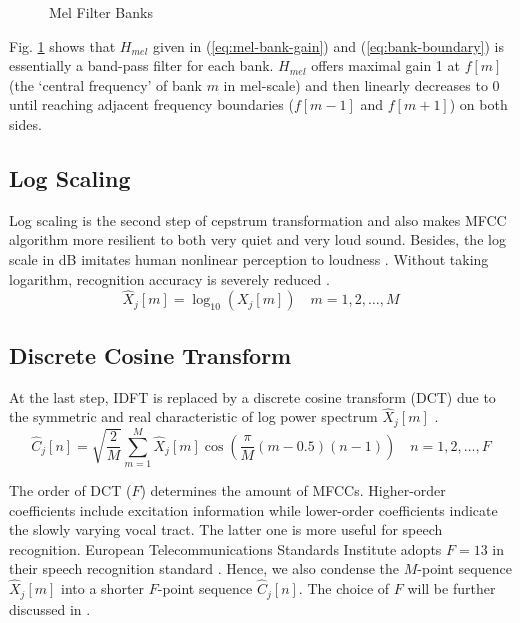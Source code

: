 \begin{figure}[H]
\centering
{}
\caption{Mel Filter Banks}
\label{mel_triangle}
\end{figure}

Fig. \ref{mel_triangle} shows that $H_{mel}$ given in (\ref{eq:mel-bank-gain}) and (\ref{eq:bank-boundary}) is essentially a band-pass filter for each bank. $H_{mel}$ offers maximal gain 1 at $f[m]$ (the `central frequency' of bank $m$ in mel-scale) and then linearly decreases to 0 until reaching adjacent frequency boundaries ($f[m-1]$ and $f[m+1]$) on both sides.


\subsection{Log Scaling}

Log scaling is the second step of cepstrum transformation and also makes MFCC algorithm more resilient to both very quiet and very loud sound. Besides, the log scale in dB imitates human nonlinear perception to loudness \cite{farin2008mathematical}. Without taking logarithm, recognition accuracy is severely reduced \cite{tan2008automatic}.
\begin{equation}
\label{eq:log-scaling}
\hat{X}_j[m] = \log_{10}(X_j[m]) \quad m = 1, 2, \dots, M
\end{equation}


\subsection{Discrete Cosine Transform}

At the last step, IDFT is replaced by a discrete cosine transform (DCT) due to the symmetric and real characteristic of log power spectrum $\hat{X}_j[m]$ \cite{picone1993signal, iser2008bandwidth}.
\begin{equation}
\label{eq:dct}
\hat{C}_j[n] = \sqrt{\frac{2}{M}} \sum^{M}_{m=1} \hat{X}_j[m] \cos \left( \frac{\pi}{M} (m - 0.5) (n-1) \right) \quad n = 1, 2, \dots, F
\end{equation}

The order of DCT ($F$) determines the amount of MFCCs. Higher-order coefficients include excitation information while lower-order coefficients indicate the slowly varying vocal tract. The latter one is more useful for speech recognition.\cite{tan2008automatic} European Telecommunications Standards Institute adopts $F = 13$ in their speech recognition standard \cite{etsi2001202}. Hence, we also condense the $M$-point sequence $\hat{X}_j[m]$ into a shorter $F$-point sequence $\hat{C}_j[n]$. The choice of $F$ will be further discussed in .
